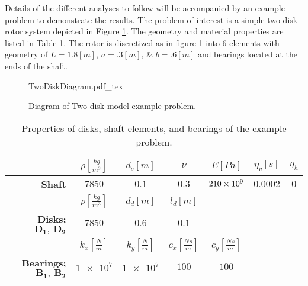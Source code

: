 Details of the different analyses to follow will be accompanied by an example problem to demonstrate the results. The problem of interest is a simple two disk rotor system depicted in Figure \ref{fig:TwoDiskDiagram}. The geometry and material properties are listed in Table \ref{tab:ExampleRotorTable}. The rotor is discretized as in figure \ref{fig:TwoDiskDiagram} into 6 elements with geometry of $ L=1.8[m] $, $ a=.3[m] $, \& $ b=.6[m] $ and bearings located at the ends of the shaft.\par 
\begin{figure}
	\centering
	\def\svgwidth{400pt}
	{TwoDiskDiagram.pdf_tex}
	\caption{Diagram of Two disk model example problem.}
	\label{fig:TwoDiskDiagram}
\end{figure}
\begin{table}
\caption{Properties of disks, shaft elements, and bearings of the example problem.} \label{tab:ExampleRotorTable}
\centering
\begin{tabular}{rcccccc}
						&$\rho[\frac{kg}{m^3}]$	&$d_s[m]$					&$\nu$				&$E[Pa]$			&$ \eta_v[s] $	&$ \eta_h $	\\\hline
	\textbf{Shaft}		&$7850$					&$0.1$					&$0.3$				&$\num{210E9}$		&$ 0.0002 $		&$ 0 $		\\[1em]
						&$\rho[\frac{kg}{m^3}]$	&$d_d[m]$					&$l_d[m]$				&					&				&			\\\hline
	\textbf{Disks;} $ \mathbf{D_1,\ D_2} $		&$7850$					&$0.6$					&$0.1$				&					&				&			\\[1em]
						&$k_x[\frac{N}{m}]$		&$k_y[\frac{N}{m}]$		&$c_x[\frac{Ns}{m}]$&$c_y[\frac{Ns}{m}]$&				&			\\\hline
	\textbf{Bearings;} $ \mathbf{B_1,\ B_2} $	&$\num{1e7}$			&$\num{1e7}$			&$100$				&$100$				&				&			
\end{tabular}
\centering
\end{table}
